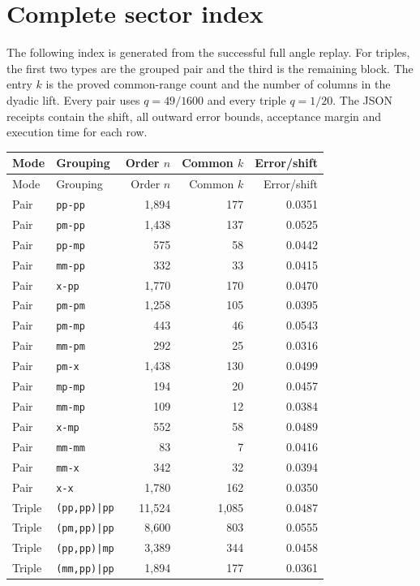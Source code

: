 \documentclass[11pt,a4paper]{article}
\theoremstyle{remark}\newtheorem{remark}[theorem]{Remark}
\begin{document}
\section{Complete sector index}\label{app:sectors}
The following index is generated from the successful full angle replay. For triples, the first two types are the grouped pair and the third is the remaining block. The entry $k$ is the proved common-range count and the number of columns in the dyadic lift. Every pair uses $q=49/1600$ and every triple $q=1/20$. The JSON receipts contain the shift, all outward error bounds, acceptance margin and execution time for each row.
\begin{longtable}{@{}llrrr@{}}
\toprule Mode&Grouping&Order $n$&Common $k$&Error/shift\\\midrule\endfirsthead
\toprule Mode&Grouping&Order $n$&Common $k$&Error/shift\\\midrule\endhead
Pair & \texttt{pp-pp} & 1,894 & 177 & 0.0351 \\
Pair & \texttt{pm-pp} & 1,438 & 137 & 0.0525 \\
Pair & \texttt{pp-mp} & 575 & 58 & 0.0442 \\
Pair & \texttt{mm-pp} & 332 & 33 & 0.0415 \\
Pair & \texttt{x-pp} & 1,770 & 170 & 0.0470 \\
Pair & \texttt{pm-pm} & 1,258 & 105 & 0.0395 \\
Pair & \texttt{pm-mp} & 443 & 46 & 0.0543 \\
Pair & \texttt{mm-pm} & 292 & 25 & 0.0316 \\
Pair & \texttt{pm-x} & 1,438 & 130 & 0.0499 \\
Pair & \texttt{mp-mp} & 194 & 20 & 0.0457 \\
Pair & \texttt{mm-mp} & 109 & 12 & 0.0384 \\
Pair & \texttt{x-mp} & 552 & 58 & 0.0489 \\
Pair & \texttt{mm-mm} & 83 & 7 & 0.0416 \\
Pair & \texttt{mm-x} & 342 & 32 & 0.0394 \\
Pair & \texttt{x-x} & 1,780 & 162 & 0.0350 \\
Triple & \texttt{(pp,pp)|pp} & 11,524 & 1,085 & 0.0487 \\
Triple & \texttt{(pm,pp)|pp} & 8,600 & 803 & 0.0555 \\
Triple & \texttt{(pp,pp)|mp} & 3,389 & 344 & 0.0458 \\
Triple & \texttt{(mm,pp)|pp} & 1,894 & 177 & 0.0361 \\

\end{longtable}
\end{document}
